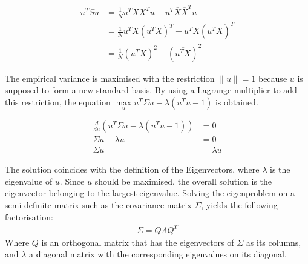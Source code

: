 \documentclass[a4paper, 11pt]{article}
\begin{document}
\begin{align*}
u^T S u & = \frac{1}{N} u^T X X^T u - u^T \overline{X} \overline{X}^T u \\
& = \frac{1}{N} u^T X (u^T X)^T  -  \overline{u^TX} (\overline{u^TX})^T  \\
& = \frac{1}{N} (u^T X)^2 - (\overline{u^TX})^2
\end{align*}

The empirical variance is maximised with the restriction $\parallel u \parallel = 1$ because $u$ is supposed to form a new standard basis. By using a Lagrange multiplier to add this restriction, the equation $\max\limits_{u} u^T \Sigma u - \lambda(u^T u - 1)$ is obtained.

\begin{align*}
 \frac{d}{du} (u^T \Sigma u - \lambda(u^T u - 1)) & = 0 \\
 \Sigma u - \lambda u & = 0 \\
 \Sigma u & = \lambda u 
\end{align*}

The solution coincides with the definition of the Eigenvectors, where $\lambda$ is the eigenvalue of $u$. Since $u$ should be maximised, the overall solution is the eigenvector belonging to the largest eigenvalue.
Solving the eigenproblem on a semi-definite matrix such as the covariance matrix $\Sigma$, yields the following factorisation:
\begin{align*}
\Sigma = Q \Lambda Q^T
\end{align*}
Where $Q$ is an orthogonal matrix that has the eigenvectors of $\Sigma$ as its columns, and $\lambda$ a diagonal matrix with the corresponding eigenvalues on its diagonal.
\end{document}
